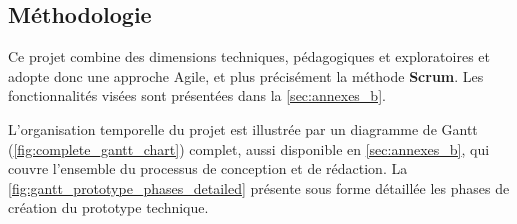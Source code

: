 \subsection{Méthodologie} \label{sec:méthodologie}

Ce projet combine des dimensions techniques, pédagogiques et exploratoires et adopte donc une approche Agile, et plus précisément la méthode \textbf{Scrum}.  
Les fonctionnalités visées sont présentées dans la \autoref{sec:annexes_b}.

L'organisation temporelle du projet est illustrée par un diagramme de Gantt (\autoref{fig:complete_gantt_chart}) complet, aussi disponible en \autoref{sec:annexes_b}, qui couvre l’ensemble du processus de conception et de rédaction.
La \autoref{fig:gantt_prototype_phases_detailed} présente sous forme détaillée les phases de création du prototype technique.

